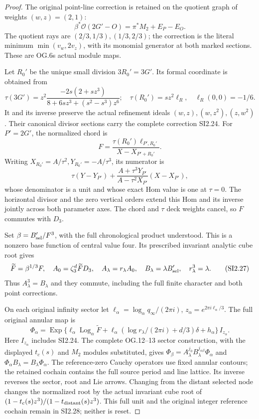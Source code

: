 \begin{proof}
The original point-line correction is retained on the quotient
graph of weights \((w,z)=(2,1)\):
\[
 \beta^*\mathcal O(2G'-O)=\pi^*M_2+E_P-E_O .
 \tag{SI2.24}
\]
The quotient rays are \((2/3,1/3),(1/3,2/3)\); the correction is
the literal minimum \(\min(v_w,2v_z)\), with its monomial generator
at both marked sections. These are OG.6\textquotesingle s actual module maps.

Let \(R_0'\) be the unique small division \(3R_0'=3G'\). Its formal
coordinate is obtained from
\[
 \tau(3G')=z^2
 \frac{-2s(2+sz^3)}{8+6sz^3+(s^2-s^3)z^6};
\quad
 \tau(R_0')=s z^2\ell_R,\quad \ell_R(0,0)=-1/6.
 \tag{SI2.25}
\]
It and its inverse preserve the actual refinement ideals
\((w,z),(w,z^2),(z,w^2)\). Their canonical divisor sections carry
the complete correction SI2.24.
For \(P'=2G'\), the normalized chord is
\[
 F=\frac{\tau(R_0')\ell_{P',R_0'}}{X-X_{P'+R_0'}} .
 \tag{SI2.26}
\]
Writing \(X_{R_0'}=A/\tau^2,Y_{R_0'}=-A/\tau^3\), its numerator is
\[
 \tau(Y-Y_{P'})+
 \frac{A+\tau^3Y_{P'}}{A-\tau^2X_{P'}}(X-X_{P'}),
\]
whose denominator is a unit and whose exact Hom value is one at
\(\tau=0\). The horizontal divisor and the zero vertical orders
extend this Hom and its inverse jointly across both parameter axes.
The chord and \(\tau\) deck weights cancel, so \(F\) commutes with
\(D_3\).

Set \(\beta=B'_{\rm sel}/F^3\), with the full chronological product
understood. This is a nonzero base function of central value four.
Its prescribed invariant analytic cube root gives
\[
 \widetilde F=\beta^{1/3}F,\quad
 A_0=\zeta_3^d\widetilde F D_3,\quad
 A_\lambda=r_\lambda A_0,\quad
 B_\lambda=\lambda B'_{\rm sel},\quad r_\lambda^3=\lambda.
 \tag{SI2.27}
\]
Thus \(A_\lambda^3=B_\lambda\) and they commute, including
the full finite character and both point corrections.

On each original infinity sector let
\(\ell_\alpha=\log_\alpha q_\infty/(2\pi i)\),
\(z_\alpha=e^{2\pi i\ell_\alpha/3}\). The full original annular map is
\[
 \Phi_\alpha=
 \operatorname{Exp}\{\ell_\alpha\operatorname{Log}_\alpha\widetilde F+
 \ell_\alpha(\log r_\lambda/(2\pi i)+d/3)\delta+h_\alpha\}\,I_{z_\alpha}.
 \tag{SI2.28}
\]
Here \(I_{z_\alpha}\) includes SI2.24. The complete OG.12--13 sector
construction, with the displayed \(t_c(s)\) and \(M_{2}\) modules substituted,
gives
\(\Phi_\beta=A_\lambda^{j_0}B_\lambda^{j_{\alpha\beta}}\Phi_\alpha\)
and \(\Phi_\alpha B_\lambda=B_\lambda\Phi_\alpha\).
The reference-zero Cauchy operators use fixed annular contours;
the retained cochain contains the full source period and line lattice.
Its inverse reverses the sector, root and Lie arrows. Changing from
the distant selected node changes the normalized root by the actual
invariant cube root of
\((1-t_c(s)z^3)/(1-t_{\rm distant}(s)z^3)\).
This full unit and the original integer reference cochain remain
in SI2.28; neither is reset.


\end{proof}
